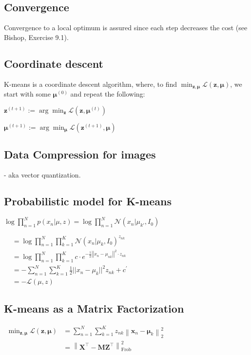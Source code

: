 \subsection*{Convergence}
Convergence to a local optimum is assured since each step decreases the cost (see Bishop, Exercise 9.1).

\subsection*{Coordinate descent}
$\mathrm{K}$-means is a coordinate descent algorithm, where, to find $\min _{\boldsymbol{z}, \boldsymbol{\mu}} \mathcal{L}(\mathbf{z}, \boldsymbol{\mu})$, we start with some $\boldsymbol{\mu}^{(0)}$ and repeat the following:

$\mathbf{z}^{(t+1)}:=\arg \min _{\boldsymbol{z}} \mathcal{L}\left(\mathbf{z}, \boldsymbol{\mu}^{(t)}\right)$

$\boldsymbol{\mu}^{(t+1)}:=\arg \min _{\boldsymbol{\mu}} \mathcal{L}\left(\mathbf{z}^{(t+1)}, \boldsymbol{\mu}\right)$

\subsection*{Data Compression for images}

- aka vector quantization.

\subsection*{Probabilistic model for K-means}

$
\log\prod_{n=1}^{N}p(x_{n}|\mu,z)=\log\prod_{n=1}^{N} \mathcal{N}(x_{n}|\mu_{k'},I_{0})
$

$\begin{aligned}&=\log\prod_{n=1}^{N}\prod_{k=1}^{K}\mathcal{N}(x_n|\mu_k,I_0)^{z_{nk}}\\&=\log\prod_{n=1}^{N}\prod_{k=1}^{K}c\cdot e^{-\frac 12\left||x_n-\mu_{nk}|\right|^2\cdot z_{nk}}\\&=-\sum_{n=1}^{N}\sum_{k=1}^{K}\frac 12||x_n-\mu_k||^2 z_{nk}+c^{\prime}\\&=-\mathcal{L}(\mu,z)\end{aligned}$

\subsection*{K-means as a Matrix Factorization}

$\begin{aligned} \min _{\mathbf{z}, \boldsymbol{\mu}} \mathcal{L}(\mathbf{z}, \boldsymbol{\mu}) & =\sum_{n=1}^{N} \sum_{k=1}^{K} z_{n k}\left\|\mathbf{x}_{n}-\boldsymbol{\mu}_{k}\right\|_{2}^{2} \\ & =\left\|\mathbf{X}^{\top}-\mathbf{M} \mathbf{Z}^{\top}\right\|_{\text {Frob }}^{2}\end{aligned}$

